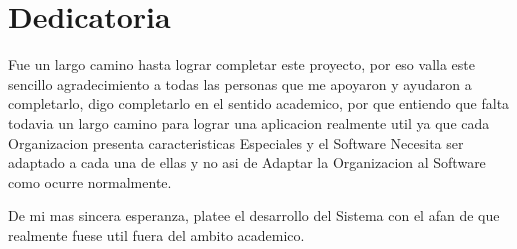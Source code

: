 \chapter{Dedicatoria}

Fue un largo camino hasta lograr completar este proyecto, por eso valla este
sencillo agradecimiento a todas las personas que me apoyaron y ayudaron a
completarlo, digo completarlo en el sentido academico, por que entiendo que falta
todavia un largo camino para lograr una aplicacion realmente util ya que cada
Organizacion presenta caracteristicas Especiales y el Software Necesita ser adaptado
a cada una de ellas y no asi de Adaptar la Organizacion al Software como ocurre
normalmente.

De mi mas sincera esperanza, platee el desarrollo del Sistema con el afan de que
realmente fuese util fuera del ambito academico.

